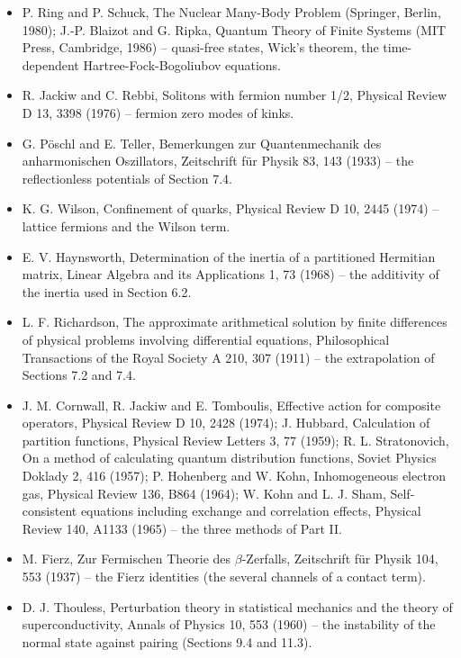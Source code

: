 \documentclass[
  10pt,
]{article}
\begin{document}
\begin{itemize}
  345 (1961) -- relativistic contact interactions and dynamical masses.
\item
  P. Ring and P. Schuck, The Nuclear Many-Body Problem (Springer,
  Berlin, 1980); J.-P. Blaizot and G. Ripka, Quantum Theory of Finite
  Systems (MIT Press, Cambridge, 1986) -- quasi-free states, Wick's
  theorem, the time-dependent Hartree-Fock-Bogoliubov equations.
\item
  R. Jackiw and C. Rebbi, Solitons with fermion number 1/2, Physical
  Review D 13, 3398 (1976) -- fermion zero modes of kinks.
\item
  G. Pöschl and E. Teller, Bemerkungen zur Quantenmechanik des
  anharmonischen Oszillators, Zeitschrift für Physik 83, 143 (1933) --
  the reflectionless potentials of Section 7.4.
\item
  K. G. Wilson, Confinement of quarks, Physical Review D 10, 2445 (1974)
  -- lattice fermions and the Wilson term.
\item
  E. V. Haynsworth, Determination of the inertia of a partitioned
  Hermitian matrix, Linear Algebra and its Applications 1, 73 (1968) --
  the additivity of the inertia used in Section 6.2.
\item
  L. F. Richardson, The approximate arithmetical solution by finite
  differences of physical problems involving differential equations,
  Philosophical Transactions of the Royal Society A 210, 307 (1911) --
  the extrapolation of Sections 7.2 and 7.4.
\item
  J. M. Cornwall, R. Jackiw and E. Tomboulis, Effective action for
  composite operators, Physical Review D 10, 2428 (1974); J. Hubbard,
  Calculation of partition functions, Physical Review Letters 3, 77
  (1959); R. L. Stratonovich, On a method of calculating quantum
  distribution functions, Soviet Physics Doklady 2, 416 (1957); P.
  Hohenberg and W. Kohn, Inhomogeneous electron gas, Physical Review
  136, B864 (1964); W. Kohn and L. J. Sham, Self-consistent equations
  including exchange and correlation effects, Physical Review 140, A1133
  (1965) -- the three methods of Part II.
\item
  M. Fierz, Zur Fermischen Theorie des \(\beta\)-Zerfalls, Zeitschrift
  für Physik 104, 553 (1937) -- the Fierz identities (the several
  channels of a contact term).
\item
  D. J. Thouless, Perturbation theory in statistical mechanics and the
  theory of superconductivity, Annals of Physics 10, 553 (1960) -- the
  instability of the normal state against pairing (Sections 9.4 and
  11.3).

\end{itemize}
\end{document}
